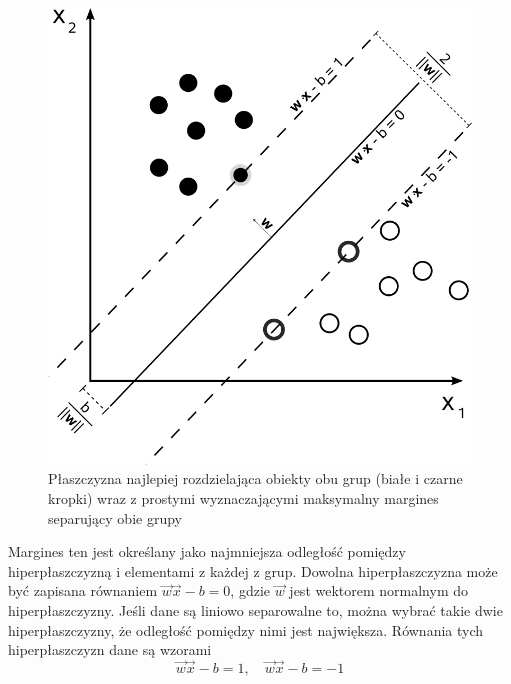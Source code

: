 \documentclass[
]{book}
\theoremstyle{plain}
\theoremstyle{definition}
\theoremstyle{definition}
\theoremstyle{definition}
\theoremstyle{definition}
\theoremstyle{remark}
\begin{document}
\begin{figure}

{\centering \includegraphics[width=11.11in]{images/Svm_max_sep_hyperplane_with_margin} 

}

\caption{Płaszczyzna najlepiej rozdzielająca obiekty obu grup (białe i czarne kropki) wraz z prostymi wyznaczającymi maksymalny margines separujący obie grupy}\label{fig:svm2}
\end{figure}

Margines ten jest określany jako najmniejsza odległość pomiędzy hiperpłaszczyzną i elementami z każdej z grup. Dowolna hiperpłaszczyzna może być zapisana równaniem \(\vec{w}\vec{x}-b=0\), gdzie \(\vec{w}\) jest wektorem normalnym do hiperpłaszczyzny. Jeśli dane są liniowo separowalne to, można wybrać takie dwie hiperpłaszczyzny, że odległość pomiędzy nimi jest największa. Równania tych hiperpłaszczyzn dane są wzorami
\begin{equation}
    \vec{w}\vec{x}-b=1, \quad \vec{w}\vec{x}-b=-1
    \label{eq:hiper1}
\end{equation}
\end{document}
